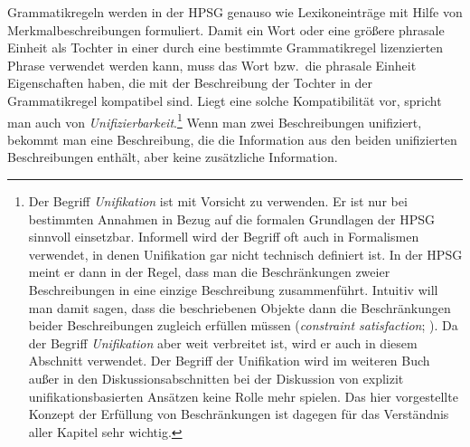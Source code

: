 \mbox{}%
Grammatikregeln werden in der HPSG genauso wie Lexikoneinträge mit Hilfe von Merkmalbeschreibungen
formuliert. %
Damit ein Wort oder eine größere phrasale Einheit als Tochter in einer durch eine bestimmte Grammatikregel lizenzierten Phrase
verwendet werden kann, muss das Wort bzw.\ die phrasale Einheit Eigenschaften haben, die mit
der Beschreibung der Tochter in der Grammatikregel kompatibel sind. Liegt eine solche Kompatibilität vor, spricht
man auch von \emph{Unifizierbarkeit}.\footnote{
  Der Begriff \emph{Unifikation} ist mit Vorsicht zu verwenden. Er ist nur bei bestimmten Annahmen
  in Bezug auf die formalen Grundlagen der HPSG sinnvoll einsetzbar. Informell wird der Begriff oft
  auch in Formalismen verwendet, in denen Unifikation gar nicht technisch definiert ist. In der HPSG
  meint er dann in der Regel, dass man die Beschränkungen zweier Beschreibungen in eine einzige
  Beschreibung zusammenführt. Intuitiv will man damit sagen, dass die beschriebenen Objekte dann die
  Beschränkungen beider Beschreibungen zugleich erfüllen müssen (\emph{constraint satisfaction}; \cite[94]{Richter2024a}). Da
  der Begriff \emph{Unifikation} aber weit verbreitet ist, wird er auch in diesem Abschnitt verwendet. Der Begriff der
  Unifikation wird im weiteren Buch außer in den Diskussionsabschnitten bei der Diskussion von explizit unifikationsbasierten
  Ansätzen keine Rolle mehr spielen. Das hier vorgestellte Konzept der
  Erfüllung von Beschränkungen ist dagegen für das Verständnis aller Kapitel sehr wichtig.%
}
Wenn man zwei Beschreibungen unifiziert, bekommt man
eine Beschreibung, die die Information aus den beiden unifizierten Beschreibungen enthält, aber
keine zusätzliche Information.

